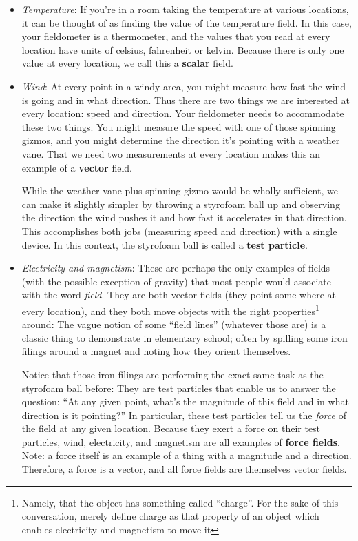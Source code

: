 \documentclass[11pt]{article}
\begin{document}
\begin{itemize}
  \item \emph{Temperature}: If you're in a room taking the temperature at various locations, it can be thought of as finding the value of the temperature field.  In this case, your fieldometer is a thermometer, and the values that you read at every location have units of celsius, fahrenheit or kelvin.  Because there is only one value at every location, we call this a \textbf{scalar} field.
  \item \emph{Wind}: At every point in a windy area, you might measure how fast the wind is going and in what direction.  Thus there are two things we are interested at every location: speed and direction.  Your fieldometer needs to accommodate these two things.  You might measure the speed with one of those spinning gizmos, and you might determine the direction it's pointing with a weather vane.  That we need two measurements at every location makes this an example of a \textbf{vector} field.
  
While the weather-vane-plus-spinning-gizmo would be wholly sufficient, we can make it slightly simpler by throwing a styrofoam ball up and observing the direction the wind pushes it and how fast it accelerates in that direction.  This accomplishes both jobs (measuring speed and direction) with a single device.  In this context, the styrofoam ball is called a \textbf{test particle}.


  \item \emph{Electricity and magnetism}:  These are perhaps the only examples of fields (with the possible exception of gravity) that most people would associate with the word \emph{field}.  They are both vector fields (they point some where at every location), and they both move objects with the right properties\footnote{Namely, that the object has something called ``charge''.  For the sake of this conversation, merely define charge as that property of an object which enables electricity and magnetism to move it} around:  The vague notion of some ``field lines'' (whatever those are) is a classic thing to demonstrate in elementary school; often by spilling some iron filings around a magnet and noting how they orient themselves.
  
Notice that those iron filings are performing the exact same task as the styrofoam ball before:   They are test particles that enable us to answer the question: ``At any given point, what's the magnitude of this field and in what direction is it pointing?''  In particular, these test particles tell us the \emph{force} of the field at any given location.  Because they exert a force on their test particles, wind, electricity, and magnetism are all examples of \textbf{force fields}.  Note: a force itself is an example of a thing with a magnitude and a direction.  Therefore, a force is a vector, and all force fields are themselves vector fields.
\end{itemize}
\end{document}
